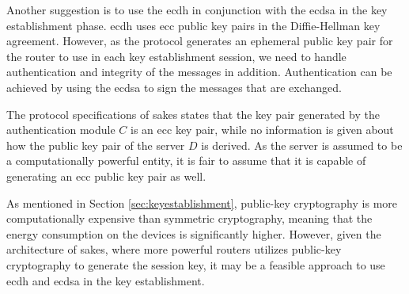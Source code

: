 Another suggestion is to use the \gls{ecdh} in conjunction with the \gls{ecdsa} \cite{johnson2001elliptic} in the key establishment phase. \gls{ecdh} uses \gls{ecc} public key pairs in the Diffie-Hellman key agreement. However, as the protocol generates an ephemeral public key pair for the router to use in each key establishment session, we need to handle authentication and integrity of the messages in addition. Authentication can be achieved by using the \gls{ecdsa} to sign the messages that are exchanged.

The protocol specifications of \gls{sakes} states that the key pair generated by the authentication module $C$ is an \gls{ecc} key pair, while no information is given about how the public key pair of the server $D$ is derived. As the server is assumed to be a computationally powerful entity, it is fair to assume that it is capable of generating an \gls{ecc} public key pair as well.

As mentioned in Section \ref{sec:keyestablishment}, public-key cryptography is more computationally expensive than symmetric cryptography, meaning that the energy consumption on the devices is significantly higher. However, given the architecture of \gls{sakes}, where more powerful routers utilizes public-key cryptography to generate the session key, it may be a feasible approach to use \gls{ecdh} and \gls{ecdsa} in the key establishment. 




